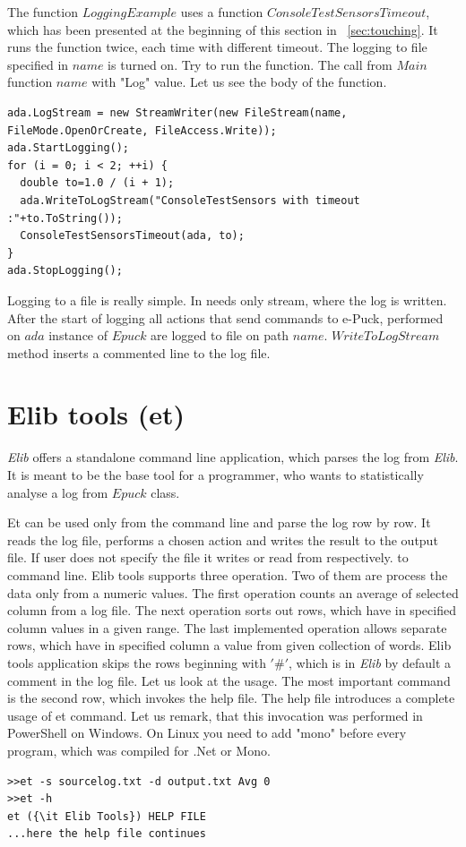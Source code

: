   The function $LoggingExample$ uses a function $ConsoleTestSensorsTimeout$, which has been presented at the beginning of this section in ~\ref{sec:touching}.
  It runs the function twice, each time with different timeout. The logging to file specified in $name$ is turned on.
  Try to run the function. The call from $Main$ function $name$ with "Log" value.
  Let us see the body of the function.
\begin{lstlisting}
ada.LogStream = new StreamWriter(new FileStream(name, FileMode.OpenOrCreate, FileAccess.Write));
ada.StartLogging();
for (i = 0; i < 2; ++i) {
  double to=1.0 / (i + 1);
  ada.WriteToLogStream("ConsoleTestSensors with timeout :"+to.ToString());
  ConsoleTestSensorsTimeout(ada, to);
}
ada.StopLogging();
\end{lstlisting}
  Logging to a file is really simple. In needs only stream, where the log is written. 
  After the start of logging all actions that send commands to e-Puck, performed on $ada$ instance of $Epuck$ are logged
  to file on path $name$.
  $WriteToLogStream$ method inserts a commented line to the log file.

\section{Elib tools (et)}\label{sec:et}
  {\it Elib} offers a standalone command line application, which
  parses the log from {\it Elib}. It is meant to be the base tool for a programmer,
  who wants to statistically analyse a log from $Epuck$ class.

  Et can be used only from the command line and parse the log row by row.
  It reads the log file, performs a chosen action and writes the result to the output file.
  If user does not specify the file it writes or read from respectively. to command line.
  Elib tools supports three operation. Two of them are process the data only from a numeric values.
  The first operation counts an average of selected column from a log file.
  The next operation sorts out rows, which have in specified column values in a given range.
  The last implemented operation allows separate rows, 
  which have in specified column a value from given collection of words.
  Elib tools application skips the rows beginning with $'\#'$, 
  which is in {\it Elib} by default a comment in the log file.
  Let us look at the usage. The most important command is the second row, which invokes the help file.
  The help file introduces a complete usage of et command.
  Let us remark, that this invocation was performed in PowerShell on Windows. On Linux you need to add "mono" before every program,
  which was compiled for .Net or Mono.
\begin{verbatim}
>>et -s sourcelog.txt -d output.txt Avg 0
>>et -h
et ({\it Elib Tools}) HELP FILE
...here the help file continues
\end{verbatim}

